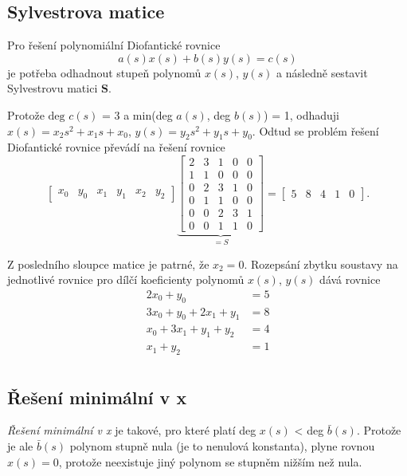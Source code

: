 \documentclass[twoside]{article}
\begin{document}
\subsection{Sylvestrova matice}
Pro řešení polynomiální Diofantické rovnice
\begin{equation}
	a(s)x(s) + b(s)y(s) = c(s)
\end{equation}
je potřeba odhadnout stupeň polynomů $x(s)$, $y(s)$ a následně sestavit Sylvestrovu matici $\mathbf{S}$.

Protože $\text{deg }c(s)$ = 3 a min(deg $a(s)$, deg $b(s)$) = 1, odhaduji  $x(s) = x_2 s^2 + x_1 s + x_0$,  $y(s) = y_2 s^2 + y_1 s + y_0$.
Odtud se problém řešení Diofantické rovnice převádí na řešení rovnice
\begin{equation}
	\begin{bmatrix}
		x_0 & y_0 & x_1 & y_1 & x_2 & y_2
	\end{bmatrix}
	\underbrace{\begin{bmatrix}
		2  &   3  &   1  &   0   &  0 \\
		1  &   1  &   0  &   0   &  0 \\
		0  &   2  &   3  &   1   &  0 \\
		0  &   1  &   1  &   0   &  0 \\
		0  &   0  &   2  &   3   &  1 \\
		0   &  0   &  1   &  1    & 0
	\end{bmatrix}}_{=S} = \begin{bmatrix}
		5 & 8 & 4 &1 & 0
	\end{bmatrix}.
\end{equation}

Z posledního sloupce matice je patrné, že $x_2 = 0$. Rozepsání zbytku soustavy na jednotlivé rovnice
pro dílčí koeficienty polynomů $x(s)$, $y(s)$ dává rovnice
\begin{equation}
	\begin{align}
		2x_0 + y_0 &= 5 \\
		3x_0 + y_0 + 2x_1 + y_1 &= 8 \\
		x_0 + 3x_1 + y_1 + y_2 &= 4 \\
		x_1 + y_2 &= 1 \\
	\end{align}
\end{equation}

\subsection{Řešení minimální v x}
\textit{Řešení minimální v x} je takové, pro které platí deg $x(s)$ < deg $\bar{b}(s)$. Protože je ale $\bar{b}(s)$
polynom stupně nula (je to nenulová konstanta), plyne rovnou $x(s) = 0$, protože neexistuje jiný polynom se stupněm nižším než nula.
\end{document}
